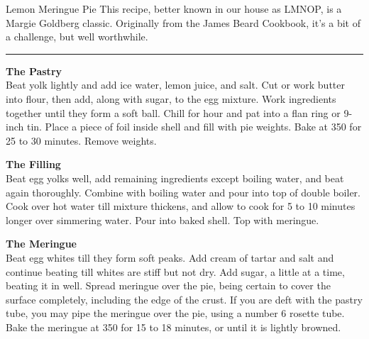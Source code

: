 \begin{recipe}{Lemon Meringue Pie}{}{}
\freeform
This recipe, better known in our house as LMNOP, is a Margie Goldberg
classic. Originally from the James Beard Cookbook, it's a bit of a
challenge, but well worthwhile.\\
\rule{\textwidth}{0.05pt}


\textbf{The Pastry}\\
Beat yolk lightly and add ice water, lemon juice, and salt. Cut or
work butter into flour, then add, along with sugar, to the egg
mixture. Work ingredients together until they form a soft ball. Chill
for  hour and pat into a flan ring or 9-inch tin. Place a piece
of foil inside shell and fill with pie weights. Bake at 350 for 25 to
30 minutes. Remove weights.



\textbf{The Filling}\\
Beat egg yolks well, add remaining ingredients except boiling water,
and beat again thoroughly. Combine with boiling water and pour into
top of double boiler. Cook over hot water till mixture thickens, and
allow to cook for 5 to 10 minutes longer over simmering water. Pour
into baked shell. Top with meringue.


\textbf{The Meringue}\\
Beat egg whites till they form soft peaks. Add cream of tartar and
salt and continue beating till whites are stiff but not dry. Add
sugar, a little at a time, beating it in well. Spread meringue over
the pie, being certain to cover the surface completely, including the
edge of the crust. If you are deft with the pastry tube, you may pipe
the meringue over the pie, using a number 6 rosette tube. Bake the
meringue at 350 for 15 to 18 minutes, or until it is lightly browned.

\end{recipe}
